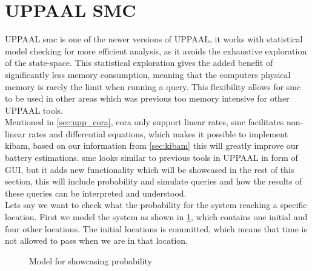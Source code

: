 \section{UPPAAL SMC}\label{sec:smc}
UPPAAL \gls{smc} is one of the newer versions of UPPAAL, it works with statistical model checking for more efficient analysis, as it avoids the exhaustive exploration of the state-space. This statistical exploration gives the added benefit of significantly less memory consumption, meaning that the computers physical memory is rarely the limit when running a query. This flexibility allows for \gls{smc} to be used in other areas which was previous too memory intensive for other UPPAAL tools\cite{cs_smc}. \\
Mentioned in \cref{sec:upp_cora}, \gls{cora} only support linear rates, \gls{smc} facilitates non-linear rates and differential equations, which makes it possible to implement \gls{kibam}, based on our information from \cref{sec:kibam} this will greatly improve our battery estimations. \gls{smc} looks similar to previous tools in UPPAAL in form of GUI, but it adds new functionality which will be showcased in the rest of this section, this will include probability and simulate queries and how the results of these queries can be interpreted and understood. \\
Lets say we want to check what the probability for the system reaching a specific location. First we model the system as shown in \cref{fig:example}, which contains one initial and four other locations. The initial locations is committed, which means that time is not allowed to pass when we are in that location.

\begin{figure}[H]
	\centering
	\caption{Model for showcasing probability}
	\label{fig:example}
\end{figure}

